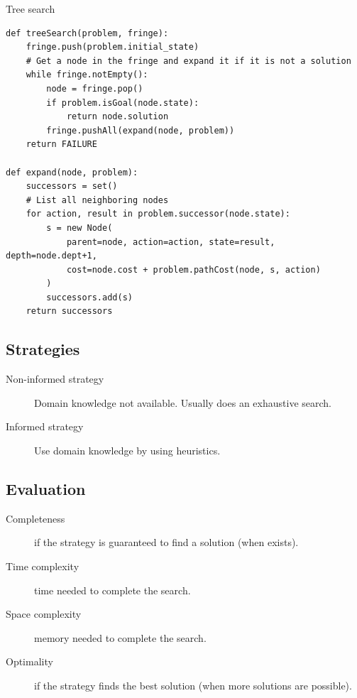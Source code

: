 \begin{algorithm}
\caption{Tree search} \label{alg:search_tree_search}
\begin{lstlisting}
def treeSearch(problem, fringe):
    fringe.push(problem.initial_state)
    # Get a node in the fringe and expand it if it is not a solution
    while fringe.notEmpty():
        node = fringe.pop()
        if problem.isGoal(node.state):
            return node.solution
        fringe.pushAll(expand(node, problem))
    return FAILURE

def expand(node, problem):
    successors = set()
    # List all neighboring nodes
    for action, result in problem.successor(node.state):
        s = new Node(
            parent=node, action=action, state=result, depth=node.dept+1,
            cost=node.cost + problem.pathCost(node, s, action)
        )
        successors.add(s)
    return successors
\end{lstlisting}
\end{algorithm}


\subsection{Strategies}
\begin{description}
    \item[Non-informed strategy] 
        Domain knowledge not available. Usually does an exhaustive search.

    \item[Informed strategy] 
        Use domain knowledge by using heuristics.
\end{description}


\subsection{Evaluation}
\begin{description}
    \item[Completeness] 
        if the strategy is guaranteed to find a solution (when exists).

    \item[Time complexity] 
        time needed to complete the search.

    \item[Space complexity] 
        memory needed to complete the search.

    \item[Optimality] 
        if the strategy finds the best solution (when more solutions are possible).
\end{description}



